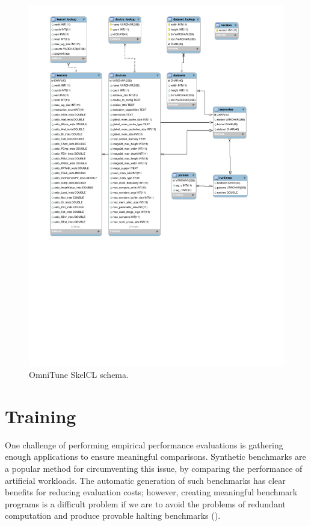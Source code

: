 \begin{figure}
\centering
\includegraphics[width=\textwidth]{img/omnitune-data-schema.pdf}
\caption{%
  OmniTune SkelCL schema.%
}
\label{fig:omnitune-system-flow}
\end{figure}


\section{Training}

One challenge of performing empirical performance evaluations is
gathering enough applications to ensure meaningful
comparisons. Synthetic benchmarks are a popular method for
circumventing this issue, by comparing the performance of artificial
workloads. The automatic generation of such benchmarks has clear
benefits for reducing evaluation costs; however, creating meaningful
benchmark programs is a difficult problem if we are to avoid the
problems of redundant computation and produce provable halting
benchmarks ().

